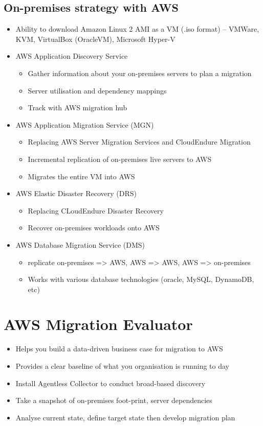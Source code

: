 {{\subsection{On-premises strategy with AWS}
\begin{itemize}
    \item Ability to download Amazon Linux 2 AMI as a VM (.iso format)
    -- VMWare, KVM, VirtualBox (OracleVM), Microsoft Hyper-V
    \item AWS Application Discovery Service
    \begin{itemize}
        \item Gather information about your on-premises servers to plan a migration
        \item Server utilisation and dependency mappings
        \item Track with AWS migration hub
    \end{itemize}
    \item AWS Application Migration Service (MGN)
    \begin{itemize}
        \item Replacing AWS Server Migration Services and CloudEndure Migration
        \item Incremental replication of on-premises live servers to AWS
        \item Migrates the entire VM into AWS
    \end{itemize}
    \item AWS Elastic Disaster Recovery (DRS)
    \begin{itemize}
        \item Replacing CLoudEndure Disaster Recovery
        \item Recover on-premises workloads onto AWS
    \end{itemize}
    \item AWS Database Migration Service (DMS)
    \begin{itemize}
        \item replicate on-premises => AWS, AWS => AWS, AWS => on-premises
        \item Works with various database technologies (oracle, MySQL, DynamoDB, etc)
    \end{itemize}
\end{itemize}


\section{AWS Migration Evaluator}
\begin{itemize}
    \item Helps you build a data-driven business case for migration to AWS
    \item Provides a clear baseline of what you organisation is running to day
    \item Install Agentless Collector to conduct broad-based discovery
    \item Take a snapshot of on-premises foot-print, server dependencies
    \item Analyse current state, define target state then develop migration plan
\end{itemize}


}}
